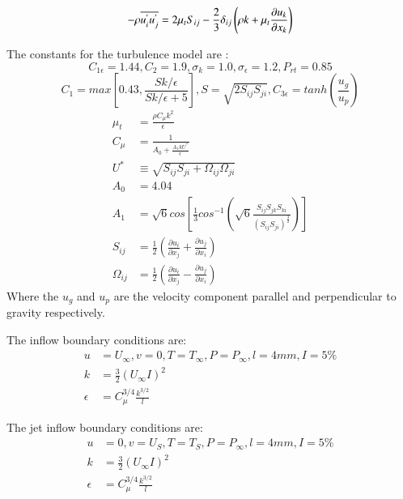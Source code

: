 \documentclass[preprint,12pt]{elsarticle}
\begin{document}
\begin{equation}
\centering
- \rho \overline{u^{'}_{i} u^{'}_{j}} = 2\mu_t S_{ij} - \frac{2}{3} \delta_{ij} \left( \rho k + \mu_t \frac{\partial u_k}{\partial x_k} \right)
\label{eq:reynoldsstress}
\end{equation}

The constants for the turbulence model are \cite{realizable,fluent} : 
\begin{equation}
\label{eq:constants}
C_{1\epsilon} = 1.44 , C_2 = 1.9 , \sigma_k = 1.0 , \sigma_\epsilon = 1.2 , P_{rt} = 0.85 
\end{equation}
\begin{equation}
C_1 = max\left[0.43,\frac{Sk/\epsilon}{Sk/\epsilon +5} \right] , S = \sqrt{2S_{ij}S_{ji}} , C_{3\epsilon} = tanh\left(\frac{u_g}{u_p}\right)
\end{equation}
\begin{subequations}
\begin{align}
\mu_t &= \frac{\rho C_{\mu} k^2}{\epsilon} \\
C_{\mu} &= \frac{1}{A_0 + \frac{A_1 k U^*}{\epsilon}} \\
U^* &\equiv \sqrt{S_{ij} S_{ji} + \Omega_{ij} \Omega_{ji}} \\
A_0 &= 4.04 \\
A_1 &= \sqrt{6} cos \left[\frac{1}{3} cos^{-1}\left(\sqrt{6} \frac{S_{ij}S_{jk}S_{ki}}{\left(S_{ij} S_{ji} \right)^{\frac{3}{2}}} \right) \right] \\
S_{ij} &= \frac{1}{2} \left( \frac{\partial u_i}{\partial x_j} + \frac{\partial u_j}{\partial x_i} \right) \\
\Omega_{ij} &= \frac{1}{2} \left( \frac{\partial u_i}{\partial x_j} - \frac{\partial u_j}{\partial x_i} \right)
\end{align}
\end{subequations}
Where the $u_g$ and $u_p$ are the velocity component parallel and perpendicular to gravity respectively.

The inflow boundary conditions are:
\begin{subequations}
\label{eq:inflow}
\begin{align}
u&=U_\infty , v=0 , T=T_\infty , P = P_\infty , l=4 mm , I=5\%\\
k&=\frac{3}{2}\left(U_\infty I\right)^2 \\
\epsilon &=C_{\mu}^{3/4} \frac{k^{3/2}}{l}
\end{align}
\end{subequations}

The jet inflow boundary conditions are:
\begin{subequations}
\label{eq:inflowjet}
\begin{align}
u&=0 , v=U_S , T=T_S , P = P_\infty , l=4 mm , I=5\%\\
k&=\frac{3}{2}\left(U_\infty I\right)^2 \\
\epsilon &=C_{\mu}^{3/4} \frac{k^{3/2}}{l}
\end{align}
\end{subequations}
\end{document}
